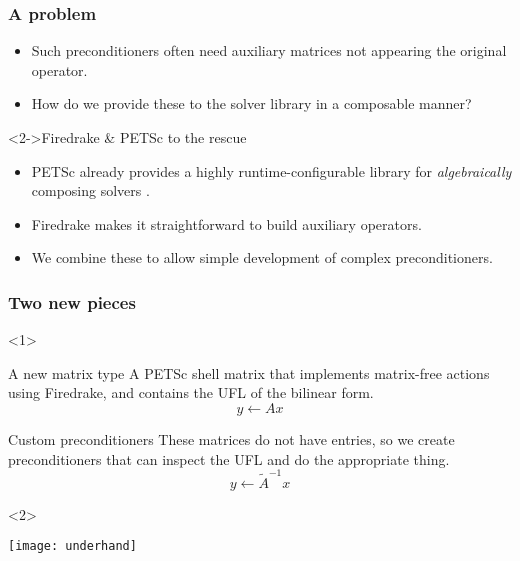 \documentclass[presentation]{beamer}
\begin{document}
\begin{frame}
  \frametitle{A problem}
  \begin{itemize}
  \item Such preconditioners often need auxiliary matrices not
    appearing the original operator.
  \item How do we provide these to the solver library in a composable
    manner?
  \end{itemize}
  \begin{block}<2->{Firedrake \& PETSc to the rescue}
  \begin{itemize}
  \item PETSc already provides a highly runtime-configurable library
    for \emph{algebraically} composing solvers \parencite{Brown:2012}.

  \item Firedrake makes it straightforward to build auxiliary
    operators.

  \item We combine these to allow simple development of complex
    preconditioners.
  \end{itemize}
  \end{block}
\end{frame}
\begin{frame}
  \frametitle{Two new pieces}
 
  \begin{onlyenv}<1>
    \begin{block}{A new matrix type}
      A PETSc shell matrix that implements matrix-free actions using
      Firedrake, and contains the UFL of the bilinear form.
      \begin{equation*}
        y \leftarrow A x
      \end{equation*}
    \end{block}
  
    \begin{block}{Custom preconditioners}
      These matrices do not have entries, so we create preconditioners
      that can inspect the UFL and do the appropriate thing.
      \begin{equation*}
        y \leftarrow \tilde{A}^{-1} x
      \end{equation*}
    \end{block}
  \end{onlyenv}
  \begin{onlyenv}<2>
    \begin{center}
      \texttt{[image: underhand]}
    \end{center}
  \end{onlyenv}
\end{frame}
\end{document}
